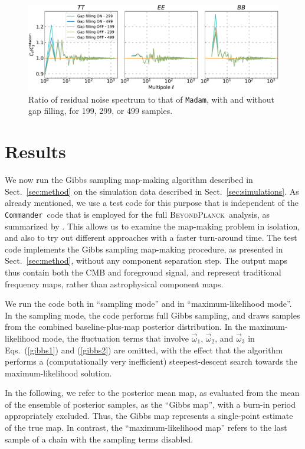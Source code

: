 \documentclass[twocolumn]{aa}
\newcommand{\ve}[1]{{\vec #1}}
\newcommand{\BP}{\textsc{BeyondPlanck}}
\newcommand{\Madam}{\texttt{Madam}}
\def\commander{\texttt{Commander}}
\begin{document}
\begin{figure}
  \center
  \includegraphics[width=18cm]{figs/Fig_residual_noise_spectrum_ratio_GapFilling.pdf}
  \caption{Ratio of residual noise spectrum to that of \Madam, with and without gap filling,
  for 199, 299, or 499 samples.}\label{fig:resnoise_gap}
\end{figure}





\section{Results}

We now run the Gibbs sampling map-making algorithm described in
Sect.~\ref{sec:method} on the simulation data described in
Sect.~\ref{sec:simulations}.  As already mentioned, we use a test code
for this purpose that is independent of the \commander\ code that is
employed for the full \BP\ analysis, as summarized by \citet{bp01}.
This allows us to examine the map-making problem in isolation, and
also to try out different approaches with a faster turn-around time.
The test code implements the Gibbs sampling map-making procedure, as
presented in Sect.~\ref{sec:method}, without any component separation
step. The output maps thus contain both the CMB and foreground signal,
and represent traditional frequency maps, rather than astrophysical
component maps.

We run the code both in ``sampling mode'' and in ``maximum-likelihood
mode''.  In the sampling mode, the code performs full Gibbs sampling,
and draws samples from the combined baseline-plus-map posterior
distribution.  In the maximum-likelihood mode, the fluctuation terms
that involve $\ve\omega_1$, $\ve\omega_2$, and $\ve\omega_3$ in
Eqs.~(\ref{gibbs1}) and (\ref{gibbs2}) are omitted, with the effect that the
algorithm performs a (computationally very inefficient)
steepest-descent search towards the maximum-likelihood solution.

In the following, we refer to the posterior mean map, as evaluated
from the mean of the ensemble of posterior samples, as the ``Gibbs
map'', with a burn-in period appropriately excluded.  Thus, the Gibbs
map represents a single-point estimate of the true map.  In contrast,
the ``maximum-likelihood map'' refers to the last sample of a chain with
the sampling terms disabled.
\end{document}
